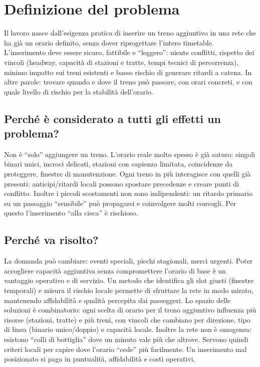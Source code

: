 \documentclass[a4paper,12pt]{report}
\begin{document}
\section{Definizione del problema}
Il lavoro nasce dall’esigenza pratica di inserire un treno aggiuntivo in una rete che ha già un orario definito, senza dover riprogettare l’intero timetable. L’inserimento deve essere sicuro, fattibile e “leggero”: niente conflitti, rispetto dei vincoli (headway, capacità di stazioni e tratte, tempi tecnici di percorrenza), minimo impatto sui treni esistenti e basso rischio di generare ritardi a catena. In altre parole: trovare quando e dove il treno può passare, con orari concreti, e con quale livello di rischio per la stabilità dell’orario.


\subsection{Perché è considerato a tutti gli effetti un problema?}
Non è “solo” aggiungere un treno.
L’orario reale molto spesso è già saturo: singoli binari unici, incroci delicati, stazioni con capienza limitata, coincidenze da proteggere, finestre di manutenzione. Ogni treno in più interagisce con quelli già presenti: anticipi/ritardi locali possono spostare precedenze e creare punti di conflitto. Inoltre i piccoli scostamenti non sono indipendenti: un ritardo primario su un passaggio “sensibile” può propagarsi e coinvolgere molti convogli. Per questo l’inserimento “alla cieca” è rischioso.



\subsection{Perché va risolto?}
La domanda può cambiare: eventi speciali, picchi stagionali, merci urgenti. Poter accogliere capacità aggiuntiva senza compromettere l’orario di base è un vantaggio operativo e di servizio. Un metodo che identifica gli slot giusti (finestre temporali) e misura il rischio locale permette di sfruttare la rete in modo mirato, mantenendo affidabilità e qualità percepita dai passeggeri.
Lo spazio delle soluzioni è combinatorio: ogni scelta di orario per il treno aggiuntivo influenza più risorse (stazioni, tratte) e più treni, con vincoli che cambiano per direzione, tipo di linea (binario unico/doppio) e capacità locale. Inoltre la rete non è omogenea: esistono “colli di bottiglia” dove un minuto vale più che altrove. Servono quindi criteri locali per capire dove l’orario “cede” più facilmente.
Un inserimento mal posizionato si paga in puntualità, affidabilità e costi operativi.
\end{document}
